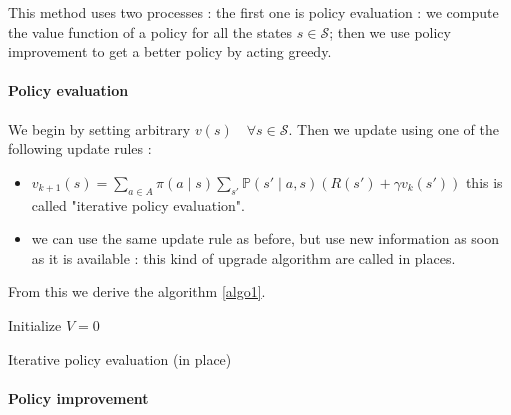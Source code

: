 \documentclass[14pt,a4paper]{article}
\theoremstyle{definition}
\begin{document}
This method uses two processes : the first one is policy evaluation : we compute the value function of a policy for all the states $s \in \mathcal{S} $; then we use policy improvement to get a better policy by acting greedy.
\paragraph{Policy evaluation} 


We begin by setting arbitrary $v(s) \quad \forall s \in \mathcal{S}$.
Then we update using one of the following update rules : 

\begin{itemize}
\item $v_{k+1}(s)=\underset{a \in A}{\sum}\pi(a \mid s)\underset{s'}{\sum}\mathbb{P}(s'\mid a,s)(R(s')+\gamma v_k(s'))$ \quad this is called "iterative policy evaluation".
\item we can use the same update rule as before, but use new information as soon as it is available : this kind of upgrade algorithm are called in places.
\end{itemize}

From this we derive the algorithm \ref{algo1}.


\begin{algorithm}
\label{algo1}

    Initialize $V = 0$\\
    
    \caption{Iterative policy evaluation (in place)}
\end{algorithm}





\paragraph{Policy improvement}
\end{document}

